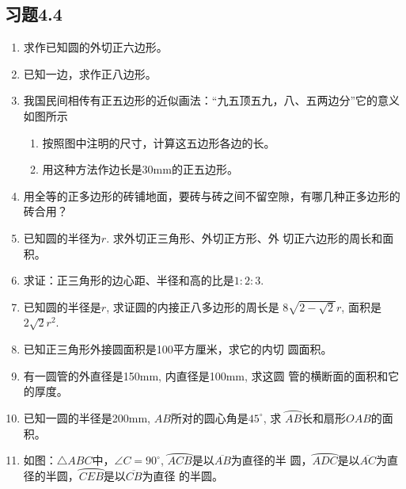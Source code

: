 \subsection*{习题4.4}
\begin{enumerate}
    \item 求作已知圆的外切正六边形。

    \item 已知一边，求作正八边形。
    \item 我国民间相传有正五边形的近似画法：“九五顶五九，八、五两边分”它的意义如图所示
\begin{enumerate}
    \item 按照图中注明的尺寸，计算这五边形各边的长。
    \item 用这种方法作边长是30mm的正五边形。
\end{enumerate}

\begin{figure}[htp]
    \centering
    \caption{}
\end{figure}

\item 用全等的正多边形的砖铺地面，要砖与砖之间不留空隙，有哪几种正多边形的砖合用？
\item 已知圆的半径为$r$. 求外切正三角形、外切正方形、外
切正六边形的周长和面积。
\item 求证：正三角形的边心距、半径和高的比是$1:2:3$.
\item 已知圆的半径是$r$, 求证圆的内接正八多边形的周长是
$8\sqrt{2-\sqrt{2}}r$, 面积是$2\sqrt{2}r^2$.
\item 已知正三角形外接圆面积是100平方厘米，求它的内切
圆面积。
\item 有一圆管的外直径是150mm, 内直径是100mm, 求这圆
管的横断面的面积和它的厚度。
\item 已知一圆的半径是200mm, $AB$所对的圆心角是$45^{\circ}$, 求
$\wideparen{AB}$长和扇形$OAB$的面积。
\item 如图：$\triangle ABC$中，$\angle C=90^{\circ}$, $\wideparen{ACB}$是以$\overline{AB}$为直径的半
圆，$\wideparen{ADC}$是以$\overline{AC}$为直径的半圆，$\wideparen{CEB}$是以$\overline{CB}$为直径
的半圆。


\end{enumerate}
